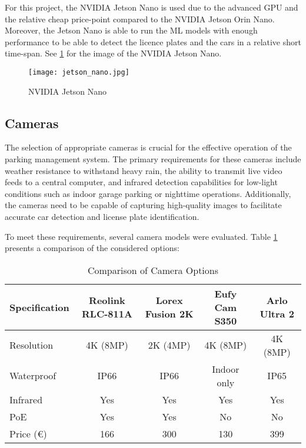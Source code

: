 For this project, the NVIDIA Jetson Nano is used due to the advanced GPU and the relative cheap price-point compared to the NVIDIA Jetson Orin Nano. Moreover, the Jetson Nano is able to run the \gls{ML} models with enough performance to be able to detect the licence plates and the cars in a relative short time-span. See \cref{fig:jetson-nano} for the image of the NVIDIA Jetson Nano.

\begin{figure}
	\texttt{[image: jetson\_nano.jpg]}
	\caption{NVIDIA Jetson Nano}\label{fig:jetson-nano}
\end{figure}

\subsection{Cameras}

The selection of appropriate cameras is crucial for the effective operation of the parking management system. The primary requirements for these cameras include weather resistance to withstand heavy rain, the ability to transmit live video feeds to a central computer, and infrared detection capabilities for low-light conditions such as indoor garage parking or nighttime operations. Additionally, the cameras need to be capable of capturing high-quality images to facilitate accurate car detection and license plate identification.

To meet these requirements, several camera models were evaluated. Table \ref{tab:camera_comparison} presents a comparison of the considered options:

\begin{table}
	\begin{tabular}{|l|c|c|c|c|}
		\hline
		\textbf{Specification} & \textbf{Reolink RLC-811A} & \textbf{Lorex Fusion 2K} & \textbf{Eufy Cam S350} & \textbf{Arlo Ultra 2} \\
		\hline
		Resolution             & 4K (8MP)                  & 2K (4MP)                 & 4K (8MP)               & 4K (8MP)              \\
		\hline
		Waterproof             & IP66                      & IP66                     & Indoor only            & IP65                  \\
		\hline
		Infrared               & Yes                       & Yes                      & Yes                    & Yes                   \\
		\hline
		PoE                    & Yes                       & Yes                      & No                     & No                    \\
		\hline
		Price (\euro)          & 166                       & 300                      & 130                    & 399                   \\
		\hline
	\end{tabular}
	\caption{Comparison of Camera Options}\label{tab:camera_comparison}
\end{table}

